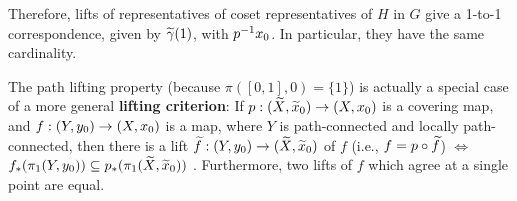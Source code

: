 \ssk

Therefore, lifts of representatives of coset representatives of $H$ in $G$ give
a 1-to-1 correspondence, given by $\widetilde{\gamma}(1)$, with $p^{-1}{x_0}$.
In particular, they have the same cardinality.

\msk

The path lifting property (because $\pi([0,1],0)=\{1\}$) is actually a special
case of a more general {\bf lifting criterion}: If 
$p:(\widetilde{X},\widetilde{x}_0)\rightarrow (X,x_0)$ is a covering map, and 
$f:(Y,y_0)\rightarrow (X,x_0)$ is a map, where
$Y$ is path-connected and locally path-connected, then there is a lift 
$\widetilde{f}:(Y,y_0)\rightarrow (\widetilde{X},\widetilde{x}_0)$ of $f$ (i.e., 
$f=p\circ\widetilde{f}$) $\Leftrightarrow$ 
$f_*(\pi_1(Y,y_0))\subseteq p_*(\pi_1(\widetilde{X},\widetilde{x}_0))$ . 
Furthermore, two lifts of $f$ which agree at a single point are equal.

\msk

